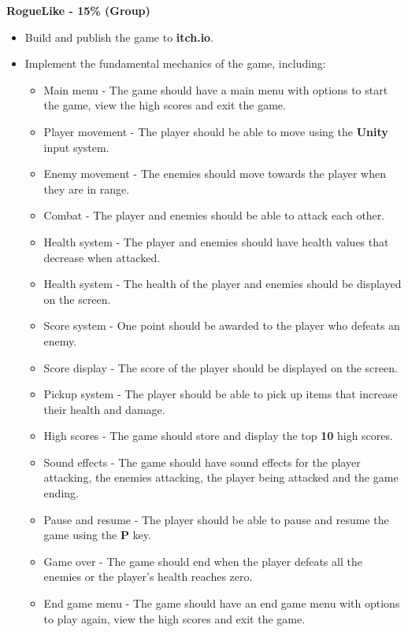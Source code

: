 \documentclass{article}
\begin{document}
\textbf{RogueLike - 15\% (Group)}
\begin{itemize}
    \item Build and publish the game to \textbf{itch.io}.
    \item Implement the fundamental mechanics of the game, including:
    \begin{itemize}
        \item Main menu - The game should have a main menu with options to start the game, view the high scores and exit the game.
        \item Player movement - The player should be able to move using the \textbf{Unity} input system.
        \item Enemy movement - The enemies should move towards the player when they are in range.
        \item Combat - The player and enemies should be able to attack each other.
        \item Health system - The player and enemies should have health values that decrease when attacked.
        \item Health system - The health of the player and enemies should be displayed on the screen.
        \item Score system - One point should be awarded to the player who defeats an enemy.
        \item Score display - The score of the player should be displayed on the screen.
        \item Pickup system - The player should be able to pick up items that increase their health and damage.
        \item High scores - The game should store and display the top \textbf{10} high scores.
        \item Sound effects - The game should have sound effects for the player attacking, the enemies attacking, the player being attacked and the game ending.
        \item Pause and resume - The player should be able to pause and resume the game using the \textbf{P} key.
        \item Game over - The game should end when the player defeats all the enemies or the player's health reaches zero.
        \item End game menu - The game should have an end game menu with options to play again, view the high scores and exit the game.
    \end{itemize}
	

\end{itemize}
\end{document}
